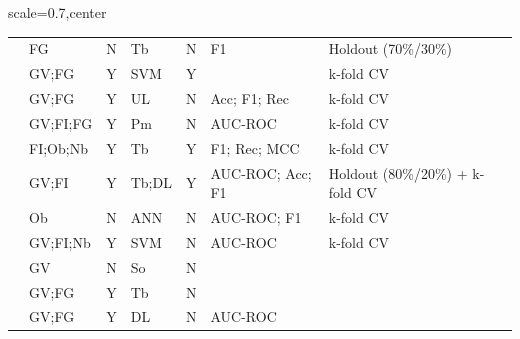 \begin{landscape}
\begin{table}[!th]
\begin{adjustbox}{scale=0.7,center}
\begin{tabular}{llclcll}
\citet{Celli2018}         & FG             & N                                    & Tb              & N                                     & F1                              & Holdout (70\%/30\%)             \\
\citet{Guan2018}          & GV;FG          & Y                                    & SVM             & Y                                     &                                 & k-fold CV                       \\
\citet{Lu2018}            & GV;FG          & Y                                    & UL              & N                                     & Acc; F1; Rec                 & k-fold CV                       \\
\citet{Wang2018}          & GV;FI;FG       & Y                                    & Pm              & N                                     & AUC-ROC                             & k-fold CV                       \\
\citet{Zhou2018}          & FI;Ob;Nb    & Y                                    & Tb              & Y                                     & F1; Rec; MCC                     & k-fold CV                       \\
\citet{Agajanian2019}     & GV;FI          & Y                                    & Tb;DL           & Y                                     & AUC-ROC; Acc; F1                    & Holdout (80\%/20\%) + k-fold CV \\
\citet{Althubaiti2019}    & Ob             & N                                    & ANN              & N                                     & AUC-ROC; F1                         & k-fold CV                       \\
\citet{Collier2019}       & GV;FI;Nb          & Y                                    & SVM             & N                                     & AUC-ROC                             & k-fold CV                       \\
\citet{Han2019}           & GV             & N                                    & So              & N                                     &                                 &                                 \\
\citet{Jiang2019}         & GV;FG          & Y                                    & Tb              & N                                     &                            &                                 \\
\citet{Luo2019}           & GV;FG          & Y                                    & DL              & N                                     & AUC-ROC                             &                                 \\

\end{tabular}
\end{adjustbox}
\end{table}
\end{landscape}
